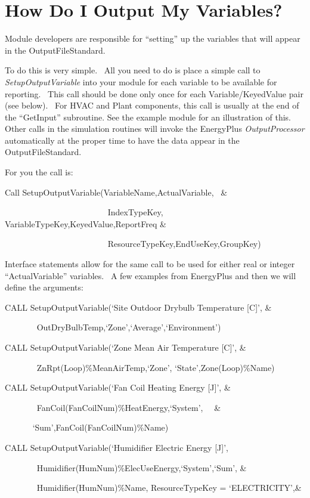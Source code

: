 \section{How Do I Output My Variables?}\label{how-do-i-output-my-variables}

Module developers are responsible for ``setting'' up the variables that will appear in the OutputFileStandard.

To do this is very simple.~ All you need to do is place a simple call to \emph{SetupOutputVariable} into your module for each variable to be available for reporting.~ This call should be done only once for each Variable/KeyedValue pair (see below).~ For HVAC and Plant components, this call is usually at the end of the ``GetInput'' subroutine. See the example module for an illustration of this. Other calls in the simulation routines will invoke the EnergyPlus \emph{OutputProcessor} automatically at the proper time to have the data appear in the OutputFileStandard.

For you the call is:

Call SetupOutputVariable(VariableName,ActualVariable,~ \&

~~~~~~~~~~~~~~~~~~~~~~~~ IndexTypeKey, VariableTypeKey,KeyedValue,ReportFreq \&

~~~~~~~~~~~~~~~~~~~~~~~~ ResourceTypeKey,EndUseKey,GroupKey)

Interface statements allow for the same call to be used for either real or integer ``ActualVariable'' variables.~ A few examples from EnergyPlus and then we will define the arguments:

CALL SetupOutputVariable(`Site Outdoor Drybulb Temperature {[}C{]}', \&

~~~~~~~ OutDryBulbTemp,`Zone',`Average',`Environment')

CALL SetupOutputVariable(`Zone Mean Air Temperature {[}C{]}', \&

~~~~~~~ ZnRpt(Loop)\%MeanAirTemp,`Zone', `State',Zone(Loop)\%Name)

CALL SetupOutputVariable(`Fan Coil Heating Energy {[}J{]}', \&

~~~~~~~ FanCoil(FanCoilNum)\%HeatEnergy,`System',~~ \&

~~~~~ ~`Sum',FanCoil(FanCoilNum)\%Name)

CALL SetupOutputVariable(`Humidifier Electric Energy {[}J{]}',

~~~~~~~ Humidifier(HumNum)\%ElecUseEnergy,`System',`Sum', \&

~~~~~~~ Humidifier(HumNum)\%Name, ResourceTypeKey = `ELECTRICITY',\&

